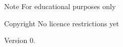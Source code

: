 \begin{DoxyNote}{Note}
For educational purposes only 
\end{DoxyNote}
\begin{DoxyCopyright}{Copyright}
No licence restrictions yet 
\end{DoxyCopyright}
\begin{DoxyVersion}{Version}
0.  
\end{DoxyVersion}
